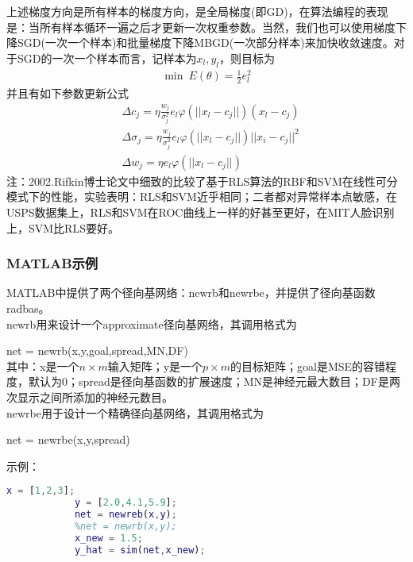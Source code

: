             \par
            上述梯度方向是所有样本的梯度方向，是全局梯度(即GD)，在算法编程的表现是：当所有样本循环一遍之后才更新一次权重参数。当然，我们也可以使用梯度下降SGD(一次一个样本)和批量梯度下降MBGD(一次部分样本)来加快收敛速度。对于SGD的一次一个样本而言，记样本为$x_l,y_l$，则目标为
            \begin{align*}
            \min \ E(\theta)  = \frac{1}{2} e_l^2
            \end{align*}
            并且有如下参数更新公式
            \begin{align*}
            & \Delta c_j = \eta \frac{w_j}{\sigma_j^2} e_l \varphi (||x_l-c_j||)(x_l-c_j)\\
            & \Delta \sigma_j = \eta \frac{w_j}{\sigma_j^2} e_l \varphi (||x_l-c_j||)||x_i-c_j||^2\\
            & \Delta w_j = \eta  e_l\varphi (||x_l-c_j||)
            \end{align*}
            注：2002.Rifkin博士论文中细致的比较了基于RLS算法的RBF和SVM在线性可分模式下的性能，实验表明：RLS和SVM近乎相同；二者都对异常样本点敏感，在USPS数据集上，RLS和SVM在ROC曲线上一样的好甚至更好，在MIT人脸识别上，SVM比RLS要好。
        \subsubsection{MATLAB示例}
            \par
            MATLAB中提供了两个径向基网络：newrb和newrbe，并提供了径向基函数radbas。\\
            newrb用来设计一个approximate径向基网络，其调用格式为
            \par
            net = newrb(x,y,goal,spread,MN,DF)\\
            其中：x是一个$n\times m$输入矩阵；y是一个$p\times m$的目标矩阵；goal是MSE的容错程度，默认为0；spread是径向基函数的扩展速度；MN是神经元最大数目；DF是两次显示之间所添加的神经元数目。\\
            newrbe用于设计一个精确径向基网络，其调用格式为
            \par
            net = newrbe(x,y,spread)
            \par
            示例：
            \begin{lstlisting}[language = Matlab]
            x = [1,2,3];
            y = [2.0,4.1,5.9];
            net = newreb(x,y);
            %net = newrb(x,y);
            x_new = 1.5;
            y_hat = sim(net,x_new);
            \end{lstlisting}
